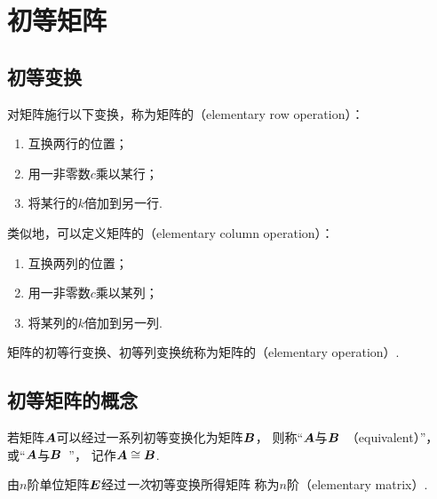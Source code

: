 \section{初等矩阵}
\subsection{初等变换}
\begin{definition}
对矩阵施行以下变换，称为矩阵的（elementary row operation）：
\begin{enumerate}
	\item 互换两行的位置；
	\item 用一非零数\(c\)乘以某行；
	\item 将某行的\(k\)倍加到另一行.
\end{enumerate}
类似地，可以定义矩阵的（elementary column operation）：
\begin{enumerate}
	\item 互换两列的位置；
	\item 用一非零数\(c\)乘以某列；
	\item 将某列的\(k\)倍加到另一列.
\end{enumerate}
矩阵的初等行变换、初等列变换统称为矩阵的（elementary operation）.
\end{definition}


\subsection{初等矩阵的概念}
\begin{definition}\label{definition:逆矩阵.矩阵等价}
若矩阵\(\boldsymbol{A}\)可以经过一系列初等变换化为矩阵\(\boldsymbol{B}\)，
则称“\(\boldsymbol{A}\)与\(\boldsymbol{B}\)~（equivalent）”，
或“\(\boldsymbol{A}\)与\(\boldsymbol{B}\)~”，
记作\(\boldsymbol{A}\cong\boldsymbol{B}\).
\end{definition}

\begin{definition}
由\(n\)阶单位矩阵\(\boldsymbol{E}\)经过\emph{一次}初等变换所得矩阵
称为\(n\)阶（elementary matrix）.
\end{definition}

